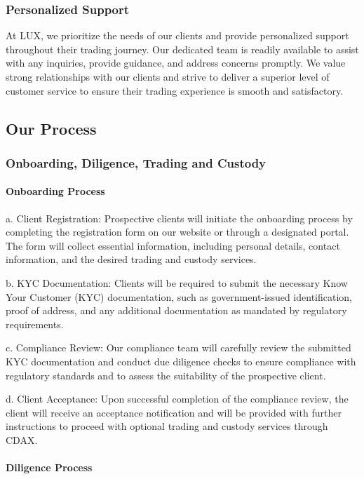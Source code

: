 \documentclass[11pt]{article}
\begin{document}
\subsubsection{Personalized Support}

At LUX, we prioritize the needs of our clients and provide personalized support throughout their trading journey. Our dedicated team is readily available to assist with any inquiries, provide guidance, and address concerns promptly. We value strong relationships with our clients and strive to deliver a superior level of customer service to ensure their trading experience is smooth and satisfactory.


\subsection{Our Process}

\subsubsection{Onboarding, Diligence, Trading and Custody}

\paragraph{Onboarding Process}

a. Client Registration: Prospective clients will initiate the onboarding process by completing the registration form on our website or through a designated portal. The form will collect essential information, including personal details, contact information, and the desired trading and custody services.


b. KYC Documentation: Clients will be required to submit the necessary Know Your Customer (KYC) documentation, such as government-issued identification, proof of address, and any additional documentation as mandated by regulatory requirements.


c. Compliance Review: Our compliance team will carefully review the submitted KYC documentation and conduct due diligence checks to ensure compliance with regulatory standards and to assess the suitability of the prospective client.


d. Client Acceptance: Upon successful completion of the compliance review, the client will receive an acceptance notification and will be provided with further instructions to proceed with optional trading and custody services through CDAX.


\paragraph{Diligence Process}
\end{document}
